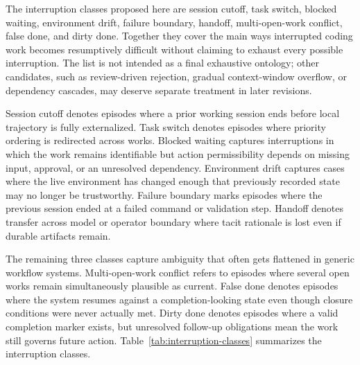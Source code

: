 \documentclass[a4paper,fleqn]{cas-dc}
\begin{document}
The interruption classes proposed here are session cutoff, task switch, blocked waiting, environment drift, failure boundary, handoff, multi-open-work conflict, false done, and dirty done. Together they cover the main ways interrupted coding work becomes resumptively difficult without claiming to exhaust every possible interruption. The list is not intended as a final exhaustive ontology; other candidates, such as review-driven rejection, gradual context-window overflow, or dependency cascades, may deserve separate treatment in later revisions.

Session cutoff denotes episodes where a prior working session ends before local trajectory is fully externalized. Task switch denotes episodes where priority ordering is redirected across works. Blocked waiting captures interruptions in which the work remains identifiable but action permissibility depends on missing input, approval, or an unresolved dependency. Environment drift captures cases where the live environment has changed enough that previously recorded state may no longer be trustworthy. Failure boundary marks episodes where the previous session ended at a failed command or validation step. Handoff denotes transfer across model or operator boundary where tacit rationale is lost even if durable artifacts remain.

The remaining three classes capture ambiguity that often gets flattened in generic workflow systems. Multi-open-work conflict refers to episodes where several open works remain simultaneously plausible as current. False done denotes episodes where the system resumes against a completion-looking state even though closure conditions were never actually met. Dirty done denotes episodes where a valid completion marker exists, but unresolved follow-up obligations mean the work still governs future action. Table~\ref{tab:interruption-classes} summarizes the interruption classes.
\end{document}
